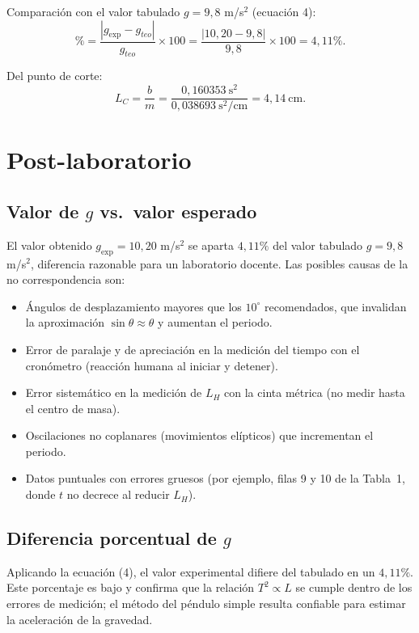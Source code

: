 \documentclass[12pt,a4paper]{article}
\begin{document}
Comparaci\'on con el valor tabulado $g = 9,8$ m/s$^2$ (ecuaci\'on 4):
\begin{equation}
    \% = \frac{|g_{\exp} - g_{teo}|}{g_{teo}} \times 100 = \frac{|10,20 - 9,8|}{9,8} \times 100 = 4,11\%.
\end{equation}

Del punto de corte:
\begin{equation}
    L_C = \frac{b}{m} = \frac{0,160353\ \text{s}^2}{0,038693\ \text{s}^2/\text{cm}} = 4,14\ \text{cm}.
\end{equation}

\section{Post-laboratorio}

\subsection{Valor de $g$ vs.\ valor esperado}
El valor obtenido $g_{\exp} = 10,20$ m/s$^2$ se aparta $4,11\%$ del valor tabulado $g = 9,8$ m/s$^2$, diferencia razonable para un laboratorio docente. Las posibles causas de la no correspondencia son:
\begin{itemize}
    \item \'Angulos de desplazamiento mayores que los $10^\circ$ recomendados, que invalidan la aproximaci\'on $\sin\theta \approx \theta$ y aumentan el periodo.
    \item Error de paralaje y de apreciaci\'on en la medici\'on del tiempo con el cron\'ometro (reacci\'on humana al iniciar y detener).
    \item Error sistem\'atico en la medici\'on de $L_H$ con la cinta m\'etrica (no medir hasta el centro de masa).
    \item Oscilaciones no coplanares (movimientos el\'ipticos) que incrementan el periodo.
    \item Datos puntuales con errores gruesos (por ejemplo, filas 9 y 10 de la Tabla~1, donde $t$ no decrece al reducir $L_H$).
\end{itemize}

\subsection{Diferencia porcentual de $g$}
Aplicando la ecuaci\'on (4), el valor experimental difiere del tabulado en un $4,11\%$. Este porcentaje es bajo y confirma que la relaci\'on $T^2 \propto L$ se cumple dentro de los errores de medici\'on; el m\'etodo del p\'endulo simple resulta confiable para estimar la aceleraci\'on de la gravedad.
\end{document}
